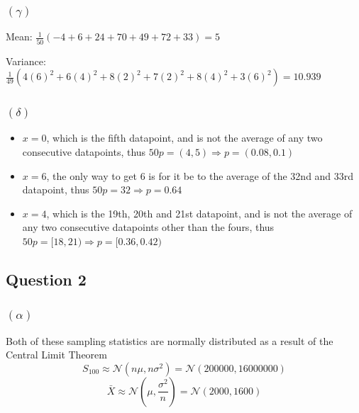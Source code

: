 \documentclass{article}
\begin{document}
\begin{figure}[h]
\centering
{}
\end{figure}

\subsubsection*{\((\gamma)\)}
Mean: \(\frac{1}{50}(-4 + 6 + 24 + 70 + 49 +72 +33) = 5\)

Variance: \(\frac{1}{49}(4(6)^2 + 6(4)^2 + 8(2)^2 + 7(2)^2 + 8(4)^2 + 3(6)^2) = 10.939\)

\subsubsection*{\((\delta)\)}
\begin{itemize}
	\item \(x=0\), which is the fifth datapoint, and is not the average of any two consecutive datapoints,
	thus \(50p = (4,5) \Rightarrow p = (0.08,0.1)\)

	\item \(x = 6\), the only way to get \(6\) is for it be to the average of the 32nd and 33rd datapoint,
	thus \(50p = 32 \Rightarrow p = 0.64\)

	\item \(x=4\), which is the 19th, 20th and 21st datapoint, and is not the average of any two consecutive datapoints other 
	than the fours,
	thus \(50p = [18,21) \Rightarrow p = [0.36, 0.42)\)
\end{itemize}



\subsection*{Question 2}
\subsubsection*{\((\alpha)\)}
Both of these sampling statistics are normally distributed as a result of the
Central Limit Theorem
\[
	S_{100} \approx \mathcal{N}(n \mu , n \sigma ^2) = \mathcal{N}(200 000, 16 000 000)
\]
\[
	\bar{X} \approx \mathcal{N}(\mu, \frac{\sigma^2}{n}) = \mathcal{N}(2 000, 1600)
\]
\end{document}
